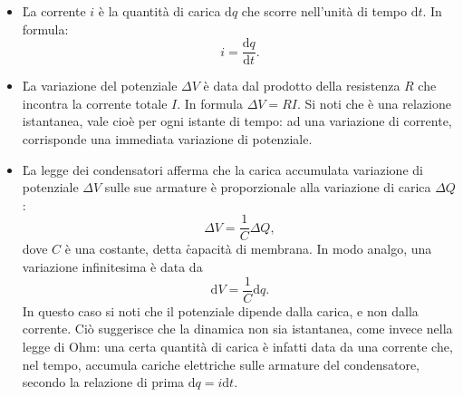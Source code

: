 \begin{itemize}
    \item \h{La corrente} $i$ è la quantità di carica $\mathrm{d}q$ che scorre nell'unità di tempo $\mathrm{d}t$. In formula:
    \begin{equation*}
        i = \frac{\mathrm{d}q}{\mathrm{d}t}.
    \end{equation*}
    
    \item \h{La variazione del potenziale} $\Delta V$ è data dal prodotto della resistenza $R$ che incontra la corrente totale $I$. In formula $ \Delta V = RI$. Si noti che è una relazione istantanea, vale cioè per ogni istante di tempo: ad una variazione di corrente, corrisponde una immediata variazione di potenziale.
    
    \item \h{La legge dei condensatori} afferma che la carica accumulata variazione di potenziale $\Delta V$ sulle sue armature è proporzionale alla variazione di carica $\Delta Q$:
    \begin{equation*}
        \Delta V =\frac{1}{C} \Delta Q,
    \end{equation*}
    dove $C$ è una costante, detta \h{capacità di membrana}. In modo analgo, una variazione infinitesima è data da
    \begin{equation*}
        \mathrm{d} V = \frac{1}{C}\mathrm{d}q.
    \end{equation*}
    In questo caso si noti che il potenziale dipende dalla carica, e non dalla corrente. Ciò suggerisce che la dinamica non sia istantanea, come invece nella legge di Ohm: una certa quantità di carica è infatti data da una corrente che, nel tempo, accumula cariche elettriche sulle armature del condensatore, secondo la relazione di prima $\mathrm{d}q = i \mathrm{d}t$.
\end{itemize}

